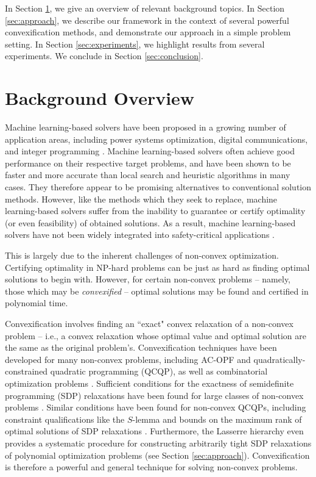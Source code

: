 \documentclass[10pt]{article} %
\theoremstyle{plain}
\theoremstyle{definition}
\theoremstyle{remark}
\begin{document}
In Section \ref{sec:background}, we give an overview of relevant background topics. In Section \ref{sec:approach}, we describe our framework in the context of several powerful convexification methods, and demonstrate our approach in a simple problem setting. In Section \ref{sec:experiments}, we highlight results from several experiments. We conclude in Section \ref{sec:conclusion}.

\section{Background Overview} \label{sec:background}

Machine learning-based solvers have been proposed in a growing number of application areas, including power systems optimization, digital communications, and integer programming \citep{van2021machine, samuel2017deep, bertsimas2022online}. Machine learning-based solvers often achieve good performance on their respective target problems, and have been shown to be faster and more accurate than local search and heuristic algorithms in many cases. They therefore appear to be promising alternatives to conventional solution methods. However, like the methods which they seek to replace, machine learning-based solvers suffer from the inability to guarantee or certify optimality (or even feasibility) of obtained solutions. As a result, machine learning-based solvers have not been widely integrated into safety-critical applications \citep{sun2023online}.

This is largely due to the inherent challenges of non-convex optimization. Certifying optimality in NP-hard problems can be just as hard as finding optimal solutions to begin with. However, for certain non-convex problems -- namely, those which may be \textit{convexified} -- optimal solutions may be found and certified in polynomial time.

Convexification involves finding an ``exact" convex relaxation of a non-convex problem -- i.e., a convex relaxation whose optimal value and optimal solution are the same as the original problem's.
Convexification techniques have been developed for many non-convex problems, including AC-OPF and quadratically-constrained quadratic programming (QCQP), as well as combinatorial optimization problems \citep{lavaei2012zero, bose2015quadratically, sherali1990hierarchy}. Sufficient conditions for the exactness of semidefinite programming (SDP) relaxations have been found for large classes of non-convex problems \citep{sojoudi2014exactness}. Similar conditions have been found for non-convex QCQPs, including constraint qualifications like the $S$-lemma and bounds on the maximum rank of optimal solutions of SDP relaxations \citep{boyd2004convex, lemon2016low}. Furthermore, the Lasserre hierarchy even provides a systematic procedure for constructing arbitrarily tight SDP relaxations of polynomial optimization problems \citep{lasserre2001global} (see Section \ref{sec:approach}). Convexification is therefore a powerful and general technique for solving non-convex problems.
\end{document}
